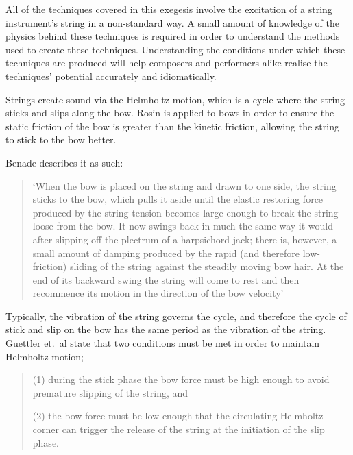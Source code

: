 All of the techniques covered in this exegesis involve the excitation of a string instrument's string in a non-standard way. 
A small amount of knowledge of the physics behind these techniques is required in order to understand the methods used to create these techniques.
Understanding the conditions under which these techniques are produced will help composers and performers alike realise the techniques' potential accurately and idiomatically.

Strings create sound via the Helmholtz motion, which is a cycle where the string sticks and slips along the bow.\autocite[]{wolfeBowsStrings}
Rosin is applied to bows in order to ensure the static friction of the bow is greater than the kinetic friction, allowing the string to stick to the bow better.

Benade describes it as such: 
\begin{quotation}
  `When the bow is placed on the string and drawn to one side, the string sticks to the bow, which pulls it aside until the elastic restoring force produced by the string tension becomes large enough to break the string loose from the bow.
  It now swings back in much the same way it would after slipping off the plectrum of a harpsichord jack; there is, however, a small amount of damping produced by the rapid (and therefore low-friction) sliding of the string against the steadily moving bow hair.
  At the end of its backward swing the string will come to rest and then recommence its motion in the direction of the bow velocity'\autocite[516]{benadeFundamentalsMusicalAcoustics1990}
\end{quotation}
Typically, the vibration of the string governs the cycle, and therefore the cycle of stick and slip on the bow has the same period as the vibration of the string.\autocite[]{wolfeBowsStrings}
Guettler et.\ al state that two conditions must be met in order to maintain Helmholtz motion;
\begin{quotation}
  (1) during the stick phase the bow force must be high enough to avoid premature slipping of the string, and 

  (2) the bow force must be low enough that the circulating Helmholtz corner can trigger the release of the string at the initiation of the slip phase.
\end{quotation}


